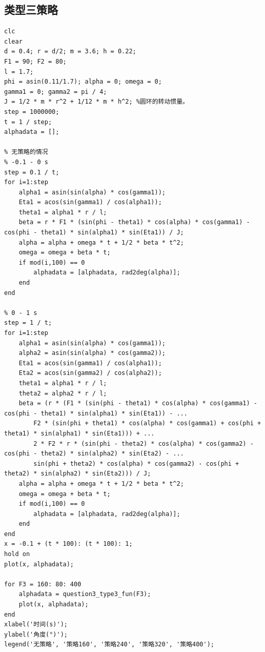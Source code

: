 \documentclass{cumcm}
\begin{document}
\subsection{类型三策略}
\begin{lstlisting}
clc
clear
d = 0.4; r = d/2; m = 3.6; h = 0.22;
F1 = 90; F2 = 80;
l = 1.7;
phi = asin(0.11/1.7); alpha = 0; omega = 0;
gamma1 = 0; gamma2 = pi / 4;
J = 1/2 * m * r^2 + 1/12 * m * h^2; %圆环的转动惯量。
step = 1000000;
t = 1 / step;
alphadata = [];

% 无策略的情况
% -0.1 - 0 s
step = 0.1 / t;
for i=1:step
    alpha1 = asin(sin(alpha) * cos(gamma1));
    Eta1 = acos(sin(gamma1) / cos(alpha1));
    theta1 = alpha1 * r / l;
    beta = r * F1 * (sin(phi - theta1) * cos(alpha) * cos(gamma1) - cos(phi - theta1) * sin(alpha1) * sin(Eta1)) / J;
    alpha = alpha + omega * t + 1/2 * beta * t^2;
    omega = omega + beta * t;
    if mod(i,100) == 0
        alphadata = [alphadata, rad2deg(alpha)];
    end
end

% 0 - 1 s
step = 1 / t;
for i=1:step
    alpha1 = asin(sin(alpha) * cos(gamma1));
    alpha2 = asin(sin(alpha) * cos(gamma2));
    Eta1 = acos(sin(gamma1) / cos(alpha1));
    Eta2 = acos(sin(gamma2) / cos(alpha2));
    theta1 = alpha1 * r / l;
    theta2 = alpha2 * r / l;
    beta = (r * (F1 * (sin(phi - theta1) * cos(alpha) * cos(gamma1) - cos(phi - theta1) * sin(alpha1) * sin(Eta1)) - ...
        F2 * (sin(phi + theta1) * cos(alpha) * cos(gamma1) + cos(phi + theta1) * sin(alpha1) * sin(Eta1))) + ...
        2 * F2 * r * (sin(phi - theta2) * cos(alpha) * cos(gamma2) - cos(phi - theta2) * sin(alpha2) * sin(Eta2) - ...
        sin(phi + theta2) * cos(alpha) * cos(gamma2) - cos(phi + theta2) * sin(alpha2) * sin(Eta2))) / J;
    alpha = alpha + omega * t + 1/2 * beta * t^2;
    omega = omega + beta * t;
    if mod(i,100) == 0
        alphadata = [alphadata, rad2deg(alpha)];
    end
end
x = -0.1 + (t * 100): (t * 100): 1;
hold on 
plot(x, alphadata);

for F3 = 160: 80: 400
    alphadata = question3_type3_fun(F3);
    plot(x, alphadata);
end
xlabel('时间(s)');
ylabel('角度(°)');
legend('无策略', '策略160', '策略240', '策略320', '策略400');
\end{lstlisting}
\end{document}
